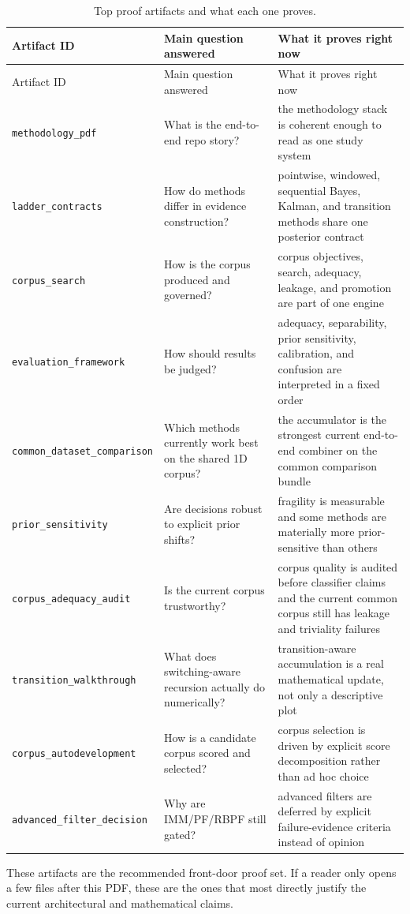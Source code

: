 \documentclass[11pt]{article}
\begin{document}
\begingroup
\small
\setlength{\tabcolsep}{4pt}
\begin{longtable}{>{\raggedright\arraybackslash}p{}>{\raggedright\arraybackslash}p{}>{\raggedright\arraybackslash}p{}}
\caption{Top proof artifacts and what each one proves.}
\label{tab:top_proof_artifacts}\\
\toprule
Artifact ID & Main question answered & What it proves right now \\
\midrule
\endfirsthead
\toprule
Artifact ID & Main question answered & What it proves right now \\
\midrule
\endhead
\texttt{methodology\_pdf} & What is the end-to-end repo story? & the methodology stack is coherent enough to read as one study system \\
\texttt{ladder\_contracts} & How do methods differ in evidence construction? & pointwise, windowed, sequential Bayes, Kalman, and transition methods share one posterior contract \\
\texttt{corpus\_search} & How is the corpus produced and governed? & corpus objectives, search, adequacy, leakage, and promotion are part of one engine \\
\texttt{evaluation\_framework} & How should results be judged? & adequacy, separability, prior sensitivity, calibration, and confusion are interpreted in a fixed order \\
\texttt{common\_dataset\_comparison} & Which methods currently work best on the shared 1D corpus? & the accumulator is the strongest current end-to-end combiner on the common comparison bundle \\
\texttt{prior\_sensitivity} & Are decisions robust to explicit prior shifts? & fragility is measurable and some methods are materially more prior-sensitive than others \\
\texttt{corpus\_adequacy\_audit} & Is the current corpus trustworthy? & corpus quality is audited before classifier claims and the current common corpus still has leakage and triviality failures \\
\texttt{transition\_walkthrough} & What does switching-aware recursion actually do numerically? & transition-aware accumulation is a real mathematical update, not only a descriptive plot \\
\texttt{corpus\_autodevelopment} & How is a candidate corpus scored and selected? & corpus selection is driven by explicit score decomposition rather than ad hoc choice \\
\texttt{advanced\_filter\_decision} & Why are IMM/PF/RBPF still gated? & advanced filters are deferred by explicit failure-evidence criteria instead of opinion \\
\bottomrule
\end{longtable}
\endgroup
These artifacts are the recommended front-door proof set. If a reader only
opens a few files after this PDF, these are the ones that most directly justify
the current architectural and mathematical claims.
\end{document}
